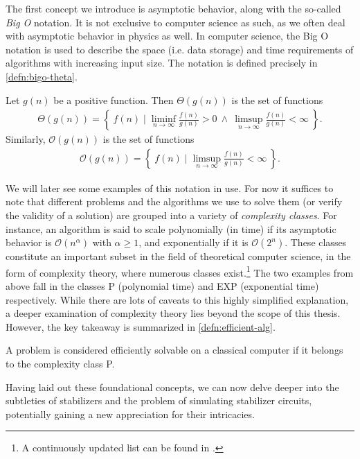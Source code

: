 The first concept we introduce is asymptotic behavior, along with the so-called
\emph{Big O} notation. It is not exclusive to computer science as such, as we
often deal with asymptotic behavior in physics as well.  In computer science,
the Big O notation is used to describe the space (i.e. data storage) and
time requirements of algorithms with increasing input size. The notation is
defined precisely in \cref{defn:bigo-theta}.
\begin{defn}\label{defn:bigo-theta}
  Let $g(n)$ be a positive function. Then $\Theta(g(n))$ is the set of
  functions 
  \begin{align*}
    \Theta(g(n)) = \left\{ \ f(n) \mid \liminf_{n\to\infty} \frac{f(n)}{g(n)} > 0 \
    \wedge \ \limsup_{n\to\infty} \frac{f(n)}{g(n)} < \infty \ \right\}
  .\end{align*}
  Similarly, $\mathcal{O}(g(n))$ is the set of functions 
  \begin{align*}
    \mathcal{O}(g(n)) = \left\{ \ f(n) \mid 
    \limsup_{n\to\infty} \frac{f(n)}{g(n)} < \infty \ \right\}
  .\end{align*}
\end{defn}
We will later see some examples of this notation in use. For now it suffices to
note that different problems and the algorithms we use to solve them (or verify
the validity of a solution) are grouped into a variety of \emph{complexity
classes}. For instance, an algorithm is said to scale polynomially (in time) if
its asymptotic behavior is $\mathcal{O}(n^\alpha)$ with $\alpha \geq 1$, and
exponentially if it is $\mathcal{O}(2^n)$. These classes constitute an
important subset in the field of theoretical computer science, in the form of
complexity theory, where numerous classes exist.\footnote{A continuously
updated list can be found in \cite{ComplexityZoo}.} The two examples from above
fall in the classes \textsf{P} (polynomial time) and \textsf{EXP} (exponential
time) respectively.  While there are lots of caveats to this highly simplified
explanation, a deeper examination of complexity theory lies beyond the scope of
this thesis. However, the key takeaway is summarized in
\cref{defn:efficient-alg}.
\begin{defn}\label{defn:efficient-alg}
  A problem is considered efficiently solvable on a classical computer if it
  belongs to the complexity class \textsf{P}.
\end{defn}
Having laid out these foundational concepts, we can now delve deeper into the
subtleties of stabilizers and the problem of simulating stabilizer
circuits, potentially gaining a new appreciation for their intricacies.

